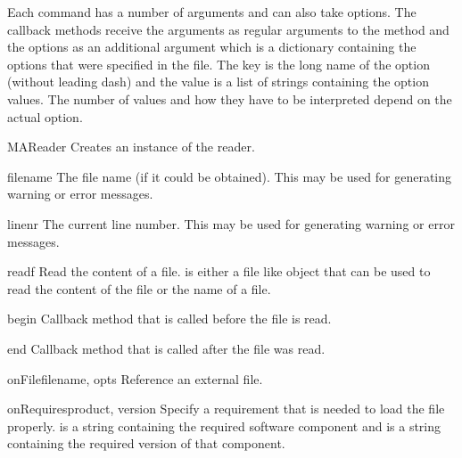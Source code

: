 Each command has a number of arguments and can also take options. The
callback methods receive the arguments as regular arguments to the
method and the options as an additional argument  which is
a dictionary containing the options that were specified in the
file. The key is the long name of the option (without leading dash)
and the value is a list of strings containing the option values.  The
number of values and how they have to be interpreted depend on the
actual option.

\begin{classdesc}{MAReader}{}
  Creates an instance of the reader.
\end{classdesc}

\begin{memberdesc}{filename}
The file name (if it could be obtained). This may be used for generating
warning or error messages.
\end{memberdesc}

\begin{memberdesc}{linenr}
The current line number. This may be used for generating warning or error
messages.
\end{memberdesc}

\begin{methoddesc}{read}{f}
Read the content of a file.  is either a file like object that
can be used to read the content of the file or the name of a file.
\end{methoddesc}

\begin{methoddesc}{begin}{}
Callback method that is called before the file is read.
\end{methoddesc}

\begin{methoddesc}{end}{}
Callback method that is called after the file was read.
\end{methoddesc}

\begin{methoddesc}{onFile}{filename, opts}
Reference an external file.
\end{methoddesc}

\begin{methoddesc}{onRequires}{product, version}
Specify a requirement that is needed to load the file properly.
 is a string containing the required software component
and  is a string containing the required version of that
component.
\end{methoddesc}

